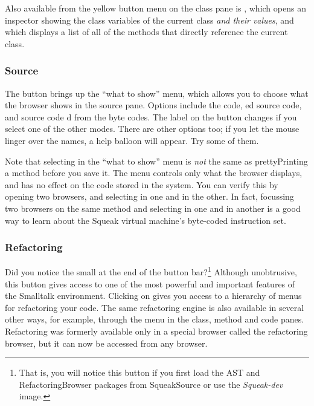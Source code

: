 \documentclass[a4paper,10pt,twoside]{book}
\begin{document}
Also available from the yellow button menu on the class pane is , which opens an inspector showing the class variables of the current class \emph{and their values}, and  which displays a list of all of the methods that directly reference the current class.

\subsubsection{Source}
\label{sec:sources}

The  button brings up the ``what to show'' menu, which allows you to choose what the browser shows in the source pane.  Options include the  code, ed source code,  and source code d from the byte codes.  The label on the button changes if you select one of the other modes.  There are other options too; if you let the mouse linger over the names, a help balloon will appear.  Try some of them.

Note that selecting  in the ``what to show'' menu is \emph{not} the same as prettyPrinting a method before you save it.  
The menu controls only what the browser displays, and has no effect on the code stored in the system.  
You can verify this  by opening two browsers, and selecting  in one and  in the other.   
In fact, focussing two browsers on the same method and selecting  in one and  in another is a good way to learn about the Squeak virtual machine's byte-coded instruction set.

\subsubsection{Refactoring}

Did you notice the small  at the end of the button bar?\footnote{That is, you will notice this button if you first load the AST and RefactoringBrowser packages from SqueakSource or use the \emph{Squeak-dev} image.} 
Although unobtrusive, this button gives access to one of the most powerful and important features of the Smalltalk environment.  
Clicking on  gives you access to a hierarchy of menus for refactoring your code.  
The same refactoring engine is also available in several other ways, for example, through the  menu in the class, method and code panes.
Refactoring was formerly available only in a special browser called the refactoring browser, but it can now be accessed from any browser.
\end{document}
